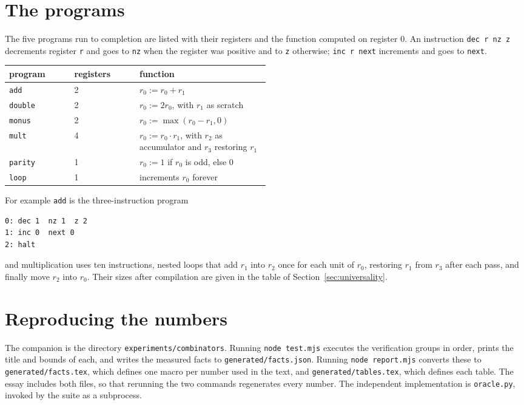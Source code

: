 \appendix

\section{The programs}\label{app:programs}

The five programs run to completion are listed with their registers and the function computed on register $0$. An instruction \texttt{dec r nz z} decrements register \texttt{r} and goes to \texttt{nz} when the register was positive and to \texttt{z} otherwise; \texttt{inc r next} increments and goes to \texttt{next}.

\begin{center}
\small
\begin{tabular}{llp{0.5\linewidth}}
\toprule
program & registers & function \\
\midrule
\texttt{add} & 2 & $r_0:=r_0+r_1$ \\
\texttt{double} & 2 & $r_0:=2r_0$, with $r_1$ as scratch \\
\texttt{monus} & 2 & $r_0:=\max(r_0-r_1,0)$ \\
\texttt{mult} & 4 & $r_0:=r_0\cdot r_1$, with $r_2$ as accumulator and $r_3$ restoring $r_1$ \\
\texttt{parity} & 1 & $r_0:=1$ if $r_0$ is odd, else $0$ \\
\texttt{loop} & 1 & increments $r_0$ forever \\
\bottomrule
\end{tabular}
\end{center}

For example \texttt{add} is the three-instruction program
\begin{lstlisting}
0: dec 1  nz 1  z 2
1: inc 0  next 0
2: halt
\end{lstlisting}
and multiplication uses ten instructions, nested loops that add $r_1$ into $r_2$ once for each unit of $r_0$, restoring $r_1$ from $r_3$ after each pass, and finally move $r_2$ into $r_0$. Their sizes after compilation are given in the table of Section~\ref{sec:universality}.

\section{Reproducing the numbers}

The companion is the directory \texttt{experiments/combinators}. Running \texttt{node test.mjs} executes the verification groups in order, prints the title and bounds of each, and writes the measured facts to \texttt{generated/facts.json}. Running \texttt{node report.mjs} converts these to \texttt{generated/facts.tex}, which defines one macro per number used in the text, and \texttt{generated/tables.tex}, which defines each table. The essay includes both files, so that rerunning the two commands regenerates every number. The independent implementation is \texttt{oracle.py}, invoked by the suite as a subprocess.

